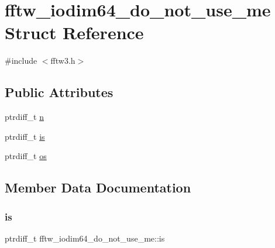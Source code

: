 \hypertarget{structfftw__iodim64__do__not__use__me}{}\section{fftw\+\_\+iodim64\+\_\+do\+\_\+not\+\_\+use\+\_\+me Struct Reference}
\label{structfftw__iodim64__do__not__use__me}


{\ttfamily \#include $<$fftw3.\+h$>$}

\subsection*{Public Attributes}
\begin{DoxyCompactItemize}
\item 
ptrdiff\+\_\+t \hyperlink{structfftw__iodim64__do__not__use__me_a19f8739d839b44db63c3aa1696a3a038}{n}
\item 
ptrdiff\+\_\+t \hyperlink{structfftw__iodim64__do__not__use__me_a1b9164674e2d091e8bde88c8d1bb7b6e}{is}
\item 
ptrdiff\+\_\+t \hyperlink{structfftw__iodim64__do__not__use__me_a44118d774124bdaa670f640537b151cf}{os}
\end{DoxyCompactItemize}


\subsection{Member Data Documentation}
\mbox{\label{structfftw__iodim64__do__not__use__me_a1b9164674e2d091e8bde88c8d1bb7b6e}} 
\subsubsection{\texorpdfstring{is}{is}}
{\footnotesize\ttfamily ptrdiff\+\_\+t fftw\+\_\+iodim64\+\_\+do\+\_\+not\+\_\+use\+\_\+me\+::is}

\mbox{\label{structfftw__iodim64__do__not__use__me_a19f8739d839b44db63c3aa1696a3a038}} 
